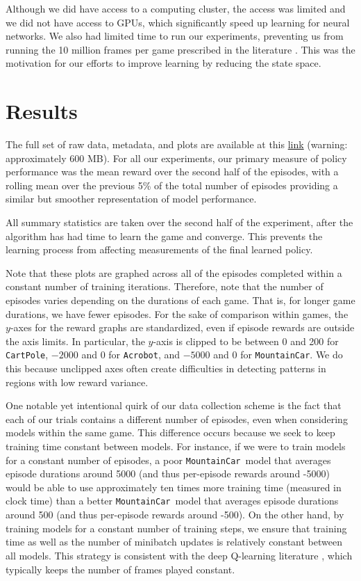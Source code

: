 \documentclass[11pt]{article}
\newcommand{\cp}{\texttt{CartPole}}
\newcommand{\ab}{\texttt{Acrobot}}
\newcommand{\mc}{\texttt{MountainCar}}
\begin{document}
Although we did have access to a computing cluster, the access was limited and we did not have access to GPUs, which significantly speed up learning for neural networks. We also had limited time to run our experiments, preventing us from running the 10 million frames per game prescribed in the literature \cite{mnih2013playing, mnih2015human}. This was the motivation for our efforts to improve learning by reducing the state space.

\section{Results}

The full set of raw data, metadata, and plots are available at this \href{https://github.com/hahakumquat/stat234-project/tree/master/data}{link} (warning: approximately 600 MB). For all our experiments, our primary measure of policy performance was the mean reward over the second half of the episodes, with a rolling mean over the previous 5\% of the total number of episodes providing a similar but smoother representation of model performance.

All summary statistics are taken over the second half of the experiment, after the algorithm has had time to learn the game and converge. This prevents the learning process from affecting measurements of the final learned policy.

Note that these plots are graphed across all of the episodes completed within a constant number of training iterations. Therefore, note that the number of episodes varies depending on the durations of each game. That is, for longer game durations, we have fewer episodes. For the sake of comparison within games, the $y$-axes for the reward graphs are standardized, even if episode rewards are outside the axis limits. In particular, the $y$-axis is clipped to be between 0 and 200 for \cp, $-2000$ and 0 for \ab, and $-5000$ and 0 for \mc. We do this because unclipped axes often create difficulties in detecting patterns in regions with low reward variance. 

One notable yet intentional quirk of our data collection scheme is the fact that each of our trials contains a different number of episodes, even when considering models within the same game. This difference occurs because we seek to keep training time constant between models. For instance, if we were to train models for a constant number of episodes, a poor \mc~model that averages episode durations around 5000 (and thus per-episode rewards around -5000) would be able to use approximately ten times more training time (measured in clock time) than a better \mc~model that averages episode durations around 500 (and thus per-episode rewards around -500). On the other hand, by training models for a constant number of training steps, we ensure that training time as well as the number of minibatch updates is relatively constant between all models. This strategy is consistent with the deep Q-learning literature \cite{mnih2013playing, mnih2015human, van2016deep}, which typically keeps the number of frames played constant.
\end{document}
